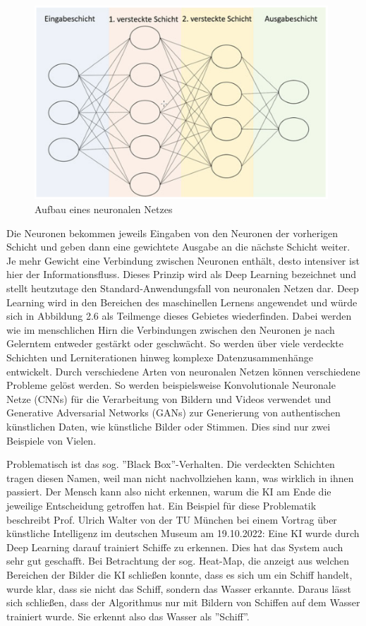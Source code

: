 \documentclass[a4paper,12pt, german]{report}
\begin{document}
\begin{figure}[H]
  \center
 \includegraphics[width=11cm]{images/KNN-Schichten.png}
  \caption[Aufbau eines neuronalen Netzes]{Aufbau eines neuronalen Netzes \cite{17}}
\end{figure}

Die Neuronen bekommen jeweils Eingaben von den Neuronen der vorherigen Schicht und geben dann eine gewichtete Ausgabe an die nächste Schicht weiter. Je mehr Gewicht eine Verbindung zwischen Neuronen enthält, desto intensiver ist hier der Informationsfluss. Dieses Prinzip wird als Deep Learning bezeichnet und stellt heutzutage den Standard-Anwendungsfall von neuronalen Netzen dar. Deep Learning wird in den Bereichen des maschinellen Lernens angewendet und würde sich in Abbildung 2.6 als Teilmenge dieses Gebietes wiederfinden. Dabei werden wie im menschlichen Hirn die Verbindungen zwischen den Neuronen je nach Gelerntem entweder gestärkt oder geschwächt. So werden über viele verdeckte Schichten und Lerniterationen hinweg komplexe Datenzusammenhänge entwickelt.\newline
Durch verschiedene Arten von neuronalen Netzen können verschiedene Probleme gelöst werden. So werden beispielsweise Konvolutionale Neuronale Netze (CNNs) für die Verarbeitung von Bildern und Videos verwendet und Generative Adversarial Networks (GANs) zur Generierung von authentischen künstlichen Daten, wie künstliche Bilder oder Stimmen. Dies sind nur zwei Beispiele von Vielen.\cite{17} 

Problematisch ist das sog. ''Black Box''-Verhalten. Die verdeckten Schichten tragen diesen Namen, weil man nicht nachvollziehen kann, was wirklich in ihnen passiert. Der Mensch kann also nicht erkennen, warum die KI am Ende die jeweilige Entscheidung getroffen hat. Ein Beispiel für diese Problematik beschreibt Prof. Ulrich Walter von der TU München bei einem Vortrag über künstliche Intelligenz im deutschen Museum am 19.10.2022: Eine KI wurde durch Deep Learning darauf trainiert Schiffe zu erkennen. Dies hat das System auch sehr gut geschafft. Bei Betrachtung der sog. Heat-Map, die anzeigt aus welchen Bereichen der Bilder die KI schließen konnte, dass es sich um ein Schiff handelt, wurde klar, dass sie nicht das Schiff, sondern das Wasser erkannte. Daraus lässt sich schließen, dass der Algorithmus nur mit Bildern von Schiffen auf dem Wasser trainiert wurde. Sie erkennt also das Wasser als ''Schiff''.\cite{16}
\end{document}
